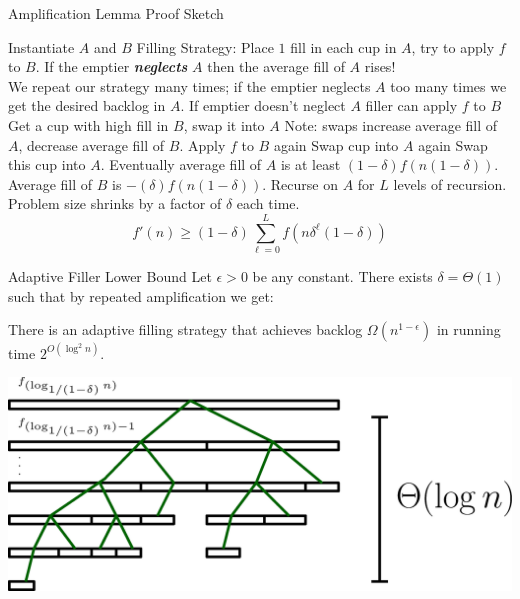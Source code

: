 \documentclass[xcolor=x11names, svgnames, rgb]{beamer}
\newcommand{\defn}[1]       {{\textit{\textbf{\boldmath #1}}}}
\begin{document}
\begin{frame}[t]{Amplification Lemma Proof Sketch}
\begin{overprint}
  \end{overprint}
  \begin{overprint}
     Instantiate $A$ and $B$
     Filling Strategy: Place $1$ fill in each cup in $A$, try to apply $f$ to $B$. 
     If the emptier \defn{neglects} $A$
    then the average fill of $A$ rises! \\We
    repeat our strategy many times; if the emptier
    neglects $A$ too many times we get the desired
    backlog in $A$.
     If emptier doesn't neglect $A$ filler can apply $f$ to $B$
     Get a cup with high fill in $B$, swap it into $A$
     Note: swaps increase average fill of $A$, decrease average fill of $B$.
     Apply $f$ to $B$ again
     Swap cup into $A$ again
     Swap this cup into $A$.
     Eventually average fill of $A$ is
    at least $(1-\delta)f(n(1-\delta))$. \\Average
    fill of $B$ is $-(\delta) f(n(1-\delta)).$
     Recurse on $A$ for $L$ levels of recursion. \\Problem size shrinks by a factor of $\delta$ each time. 
     $$f'(n) \ge (1-\delta)\sum_{\ell=0}^L f(n\delta^\ell(1-\delta))$$
  \end{overprint}
\end{frame}

\begin{frame}[t]{Adaptive Filler Lower Bound}
  Let $\epsilon > 0$ be any constant. There exists
  $\delta=\Theta(1)$ such that by repeated amplification we get: 
  \begin{theorem}
    There is an adaptive filling strategy that achieves
    backlog $\Omega(n^{1-\epsilon})$  in running time $2^{O(\log^2 n)}$.
  \end{theorem}
  \begin{center}
  \includegraphics[width=0.9\linewidth]{amplificationImgs/quasipoly_cor.eps}
  \end{center}
\end{frame}
\end{document}
